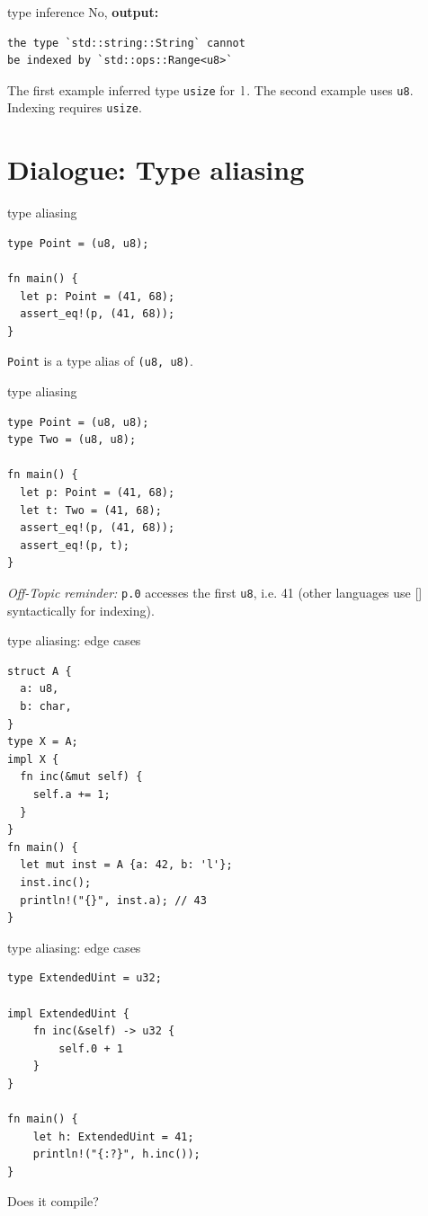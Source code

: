 \documentclass{beamer}
\newcommand\code[1]{\,{\color[HTML]{884400}#1}\,}
\begin{document}
\begin{frame}[fragile]{type inference}
  No, \textbf{output:}
  \begin{verbatim}
the type `std::string::String` cannot
be indexed by `std::ops::Range<u8>`
  \end{verbatim}

  The first example inferred type \texttt{usize} for \code{l}.
  The second example uses \texttt{u8}. Indexing requires \texttt{usize}.
\end{frame}


\section{Dialogue: Type aliasing}

\begin{frame}[fragile]{type aliasing}
  \begin{verbatim}
type Point = (u8, u8);

fn main() {
  let p: Point = (41, 68);
  assert_eq!(p, (41, 68));
}
  \end{verbatim}
  \texttt{Point} is a type alias of \texttt{(u8, u8)}.
\end{frame}

\begin{frame}[fragile]{type aliasing}
  \begin{verbatim}
type Point = (u8, u8);
type Two = (u8, u8);

fn main() {
  let p: Point = (41, 68);
  let t: Two = (41, 68);
  assert_eq!(p, (41, 68));
  assert_eq!(p, t);
}
  \end{verbatim}

  \emph{Off-Topic reminder:} \texttt{p.0} accesses the first \texttt{u8}, i.e. 41 (other languages use [] syntactically for indexing).
\end{frame}

\begin{frame}[fragile]{type aliasing: edge cases}
  \begin{verbatim}
struct A {
  a: u8,
  b: char,
}
type X = A;
impl X {
  fn inc(&mut self) {
    self.a += 1;
  }
}
fn main() {
  let mut inst = A {a: 42, b: 'l'};
  inst.inc();
  println!("{}", inst.a); // 43
}
  \end{verbatim}
\end{frame}

\begin{frame}[fragile]{type aliasing: edge cases}
  \begin{verbatim}
type ExtendedUint = u32;

impl ExtendedUint {
    fn inc(&self) -> u32 {
        self.0 + 1
    }
}

fn main() {
    let h: ExtendedUint = 41;
    println!("{:?}", h.inc());
}
  \end{verbatim}

  Does it compile?
\end{frame}
\end{document}
